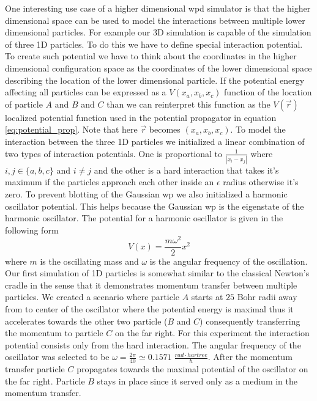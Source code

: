 One interesting use case of a higher dimensional \acrshort{wpd} simulator is that the higher dimensional space can be used to model the interactions between multiple lower dimensional particles.
For example our 3D simulation is capable of the simulation of three 1D particles.
To do this we have to define special interaction potential.
To create such potential we have to think about the coordinates in the higher dimensional configuration space as the coordinates of the lower dimensional space describing the location of the lower dimensional particle.
If the potential energy affecting all particles can be expressed as a $V(x_a, x_b, x_c)$ function of the location of particle $A$ and $B$ and $C$ than we can reinterpret this function as the $V(\vec{r})$ localized potential function used in the potential propagator in equation \ref{eq:potential_prop}.
Note that here $\vec{r}$ becomes $(x_a, x_b, x_c)$.
To model the interaction between the three 1D particles we initialized a linear combination of two types of interaction potentials.
One is proportional to $\frac{1}{|x_i - x_j|}$ where $i,j\in\{a,b,c\}$ and $i\neq j$ and the other is a hard interaction that takes it's maximum if the particles approach each other inside an $\epsilon$ radius otherwise it's zero.
To prevent blotting of the Gaussian \acrshort{wp} we also initialized a harmonic oscillator potential.
This helps because the Gaussian \acrshort{wp} is the eigenstate of the harmonic oscillator.
The potential for a harmonic oscillator is given in the following form
\begin{equation}
	\label{eq:harmonic_osc}
	V(x) = \frac{m\omega^2}{2}x^2
\end{equation}
where $m$ is the oscillating mass and $\omega$ is the angular frequency of the oscillation.
Our first simulation of 1D particles is somewhat similar to the classical Newton's cradle \cite{}
in the sense that it demonstrates momentum transfer between multiple particles.
We created a scenario where particle $A$ starts at $25$ Bohr radii away from to center of the oscillator where the potential energy is maximal thus it accelerates towards the other two particle ($B$ and $C$) consequently transferring the momentum to particle $C$ on the far right.
For this experiment the interaction potential consists only from the hard interaction.
The angular frequency of the oscillator was selected to be $\omega = \frac{2\pi}{40} \simeq 0.1571\; \frac{rad\cdot hartree}{\hbar}$.
After the momentum transfer particle $C$ propagates towards the maximal potential of the oscillator on the far right.
Particle $B$ stays in place since it served only as a medium in the momentum transfer.
